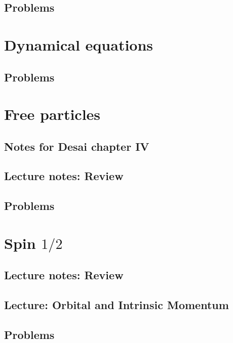       \section{Problems}
         

   \chapter{Dynamical equations}
      
      \section{Problems}
         

   \chapter{Free particles}
      \section{Notes for Desai chapter IV}
         
      \section{Lecture notes: Review}
         
      \section{Problems}
         

   \chapter{Spin $1/2$}
      \section{Lecture notes: Review}
         
      \section{Lecture: Orbital and Intrinsic Momentum}
         
      \section{Problems}
         

